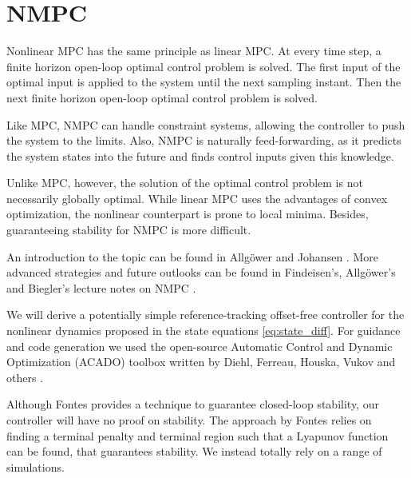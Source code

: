 \section{NMPC} 
Nonlinear MPC has the same principle as linear MPC. At every time step, a finite horizon open-loop optimal control problem is solved. The first input of the optimal input is applied to the system until the next sampling instant. Then the next finite horizon open-loop optimal control problem is solved.

Like MPC, NMPC can handle constraint systems, allowing the controller to push the system to the limits. Also, NMPC is naturally feed-forwarding, as it predicts the system states into the future and finds control inputs given this knowledge. 

Unlike MPC, however, the solution of the optimal control problem is not necessarily globally optimal. While linear MPC uses the advantages of convex optimization, the nonlinear counterpart is prone to local minima. Besides, guaranteeing stability for NMPC is more difficult. 

An introduction to the topic can be found in Allgöwer and Johansen \cite{Allgower2004,Johansen2011}. More advanced strategies and future outlooks can be found in Findeisen's, Allgöwer's and Biegler's lecture notes on NMPC \cite{Findeisen2007}.

We will derive a potentially simple reference-tracking offset-free controller for the nonlinear dynamics proposed in the state equations \ref{eq:state_diff}. For guidance and code generation we used the open-source Automatic Control and Dynamic Optimization (ACADO) toolbox written by Diehl, Ferreau, Houska, Vukov and others \cite{Houska2011,Vukov2013}.

Although Fontes \cite{Fontes2001} provides a technique to guarantee closed-loop stability, our controller will have no proof on stability. The approach by Fontes relies on finding a terminal penalty and terminal region such that a Lyapunov function can be found, that guarantees stability. We instead totally rely on a range of simulations. 

